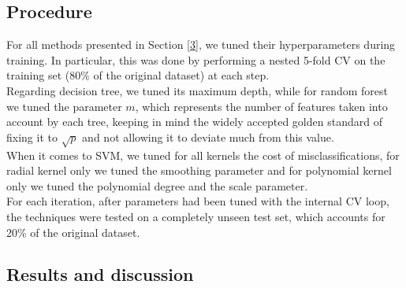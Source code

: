 \documentclass{article}
\begin{document}
\subsection{Procedure}
For all methods presented in Section \ref{3}, we tuned their hyperparameters during training. In particular, this was done by performing a nested 5-fold CV on the training set (80\% of the original dataset) at each step.
\\Regarding decision tree, we tuned its maximum depth, while for random forest we tuned the parameter $m$, which represents the number of features taken into account by each tree, keeping in mind the widely accepted golden standard of fixing it to $\sqrt{p}$ and not allowing it to deviate much from this value.
\\When it comes to SVM, we tuned for all kernels the cost of misclassifications, for radial kernel only we tuned the smoothing parameter and for polynomial kernel only we tuned the polynomial degree and the scale parameter.
\\For each iteration, after parameters had been tuned with the internal CV loop, the techniques were tested on a completely unseen test set, which accounts for 20\% of the original dataset.

\subsection{Results and discussion}



\newpage


\end{document}
